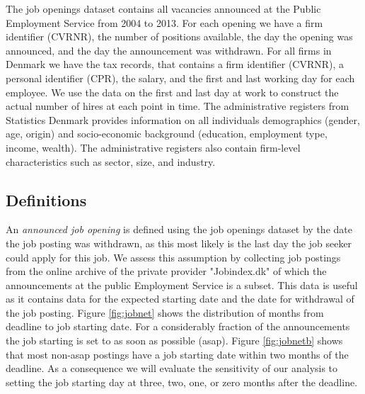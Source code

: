 \documentclass[11pt,article]{memoir}
\begin{document}
 The job openings  dataset  contains all  vacancies announced at the Public Employment Service from 2004 to 2013. For each opening we have a firm identifier (CVRNR), the number of positions available, the day the opening was announced, and the day the announcement was withdrawn. For all firms in Denmark we have the tax records, that contains a firm identifier (CVRNR), a personal identifier (CPR),  the salary, and the first and last working day for each employee.  We use the data on the first and last day at work to construct the actual number of hires at each point in time. The administrative registers from Statistics Denmark provides information on all individuals demographics (gender, age, origin) and socio-economic background (education, employment type, income, wealth). The administrative registers also contain firm-level characteristics such as sector, size, and industry. 
 
\subsection{Definitions}
An \textit{announced job opening} is defined using the job openings dataset by the date the job posting was withdrawn, as this most likely is the last day the job seeker could apply for this job. We assess this assumption by collecting job postings from the online archive of the private provider "Jobindex.dk" of which the announcements at the public Employment Service is a subset. This data is useful as it contains data for the expected starting date and the date for withdrawal of the job posting. Figure \ref{fig:jobnet} shows the distribution of months from deadline to job starting date. For a considerably fraction of the announcements the job starting is set to as soon as possible (asap). Figure \ref{fig:jobnetb} shows that most non-asap postings have a job starting date within two months of the deadline. As a consequence we will evaluate the sensitivity of our analysis to setting the job starting day at three, two, one, or zero months after the deadline.
\end{document}
